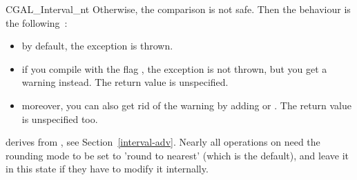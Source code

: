 \begin{ccClass} {CGAL_Interval_nt}
Otherwise, the comparison is not safe.  Then the behaviour is the following~:
\begin{itemize}
\item by default, the exception
     is thrown.
\item if you compile with the flag , the exception
    is not thrown, but you get a warning instead.
    The return value is unspecified.
\item moreover, you can also get rid of the warning by adding
     or .
    The return value is unspecified too.
\end{itemize}

\ccImplementation

 derives from , 
see Section~\ref{interval-adv}.  Nearly all operations on
 need the rounding mode to be set to 'round to nearest'
(which is the default),
and leave it in this state if they have to modify it internally.

% 
% 
% 
% 
% 
% 

\end{ccClass}

